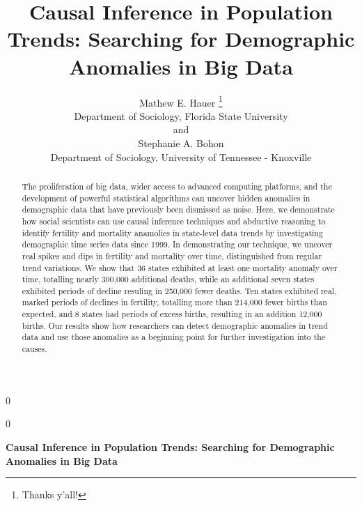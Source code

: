 \documentclass[12pt]{article}
\newcommand{\blind}{0}
\begin{document}
\def\spacingset#1{\renewcommand{\baselinestretch}%
{#1}\small\normalsize} \spacingset{1}



\blind
{
  \title{\bf Causal Inference in Population Trends: Searching for Demographic
Anomalies in Big Data}

  \author{
        Mathew E. Hauer \thanks{Thanks y'all!} \\
    Department of Sociology, Florida State University\\
     and \\     Stephanie A. Bohon \\
    Department of Sociology, University of Tennessee - Knoxville\\
      }
  \maketitle
} \fi

\blind
{
  \bigskip
  \bigskip
  \bigskip
  \begin{center}
    {\LARGE\bf Causal Inference in Population Trends: Searching for Demographic
Anomalies in Big Data}
  \end{center}
  \medskip
} \fi

\bigskip
\begin{abstract}
The proliferation of big data, wider access to advanced computing
platforms, and the development of powerful statistical algorithms can
uncover hidden anomalies in demographic data that have previously been
dismissed as noise. Here, we demonstrate how social scientists can use
causal inference techniques and abductive reasoning to identify
fertility and mortality anamolies in state-level data trends by
investigating demographic time series data since 1999. In demonstrating
our technique, we uncover real spikes and dips in fertility and
mortality over time, distinguished from regular trend variations. We
show that 36 states exhibited at least one mortality anomaly over time,
totalling nearly 300,000 additional deaths, while an additional seven
states exhibited periods of decline resuling in 250,000 fewer deaths.
Ten states exhibited real, marked periods of declines in fertility,
totalling more than 214,000 fewer births than expected, and 8 states had
periods of excess births, resulting in an addition 12,000 births. Our
results show how researchers can detect demographic anomalies in trend
data and use those anomalies as a beginning point for further
investigation into the causes.
\end{abstract}
\end{document}
